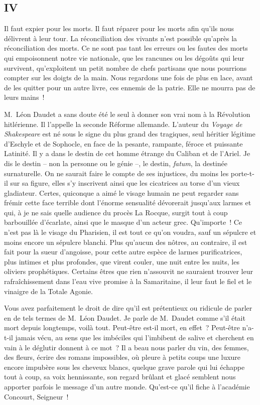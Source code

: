 \documentclass[french,twoside]{book} %
\begin{document}
\subsection[{IV}]{IV}
\noindent Il faut expier pour les morts. Il faut réparer pour les morts afin qu’ils nous délivrent à leur tour. La réconciliation des vivants n’est possible qu’après la réconciliation des morts. Ce ne sont pas tant les erreurs ou les fautes des morts qui empoisonnent notre vie nationale, que les rancunes ou les dégoûts qui leur survivent, qu’exploitent un petit nombre de chefs partisans que nous pourrions compter sur les doigts de la main. Nous regardons une fois de plus en lace, avant de les quitter pour un autre livre, ces ennemis de la patrie. Elle ne mourra pas de leurs mains !\par
M. Léon Daudet a sans doute été le seul à donner son vrai nom à la Révolution hitlérienne. Il l’appelle la seconde Réforme allemande. L’auteur du \emph{Voyage de Shakespeare} est né sous le signe du plus grand des tragiques, seul héritier légitime d’Eschyle et de Sophocle, en face de la pesante, rampante, féroce et puissante Latinité. Il y a dans le destin de cet homme étrange du Caliban et de l’Ariel. Je dis le destin – non la personne ou le génie –, le destin, \emph{fatum}, la destinée surnaturelle. On ne saurait faire le compte de ses injustices, du moins les porte-t-il sur sa figure, elles s’y inscrivent ainsi que les cicatrices au torse d’un vieux gladiateur. Certes, quiconque a aimé le visage humain ne peut regarder sans frémir cette face terrible dont l’énorme sensualité dévorerait jusqu’aux larmes et qui, à je ne sais quelle audience du procès La Rocque, surgit tout à coup barbouillée d’écarlate, ainsi que le masque d’un acteur grec. Qu’importe ! Ce n’est pas là le visage du Pharisien, il est tout ce qu’on voudra, sauf un sépulcre et moins encore un sépulcre blanchi. Plus qu’aucun des nôtres, au contraire, il est fait pour la sueur d’angoisse, pour cette autre espèce de larmes purificatrices, plus intimes et plus profondes, que virent couler, une nuit entre les nuits, les oliviers prophétiques. Certains êtres que rien n’assouvit ne sauraient trouver leur rafraîchissement dans l’eau vive promise à la Samaritaine, il leur faut le fiel et le vinaigre de la Totale Agonie.\par
Vous avez parfaitement le droit de dire qu’il est prétentieux ou ridicule de parler en de tels termes de M. Léon Daudet. Je parle de M. Daudet comme s’il était mort depuis longtemps, voilà tout. Peut-être est-il mort, en effet ? Peut-être n’a-t-il jamais vécu, au sens que les imbéciles qui l’imbibent de salive et cherchent en vain à le déglutir donnent à ce mot ? Il a beau nous parler du vin, des femmes, des fleurs, écrire des romans impossibles, où pleure à petits coups une luxure encore impubère sous les cheveux blancs, quelque grave parole qui lui échappe tout à coup, sa voix hennissante, son regard brûlant et glacé semblent nous apporter parfois le message d’un autre monde. Qu’est-ce qu’il fiche à l’académie Concourt, Seigneur !\par
\end{document}
